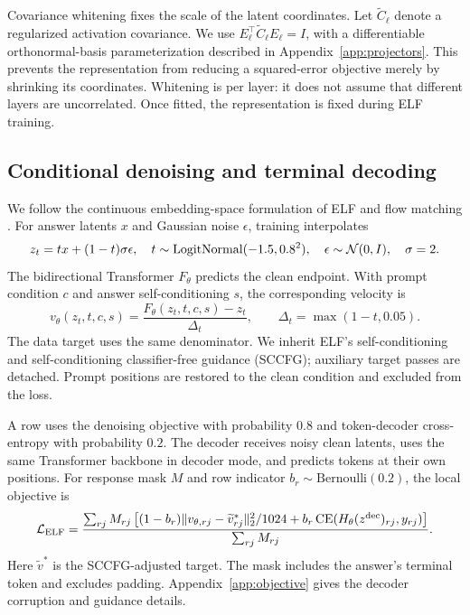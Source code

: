 Covariance whitening fixes the scale of the latent coordinates. Let $\widetilde C_\ell$ denote a regularized activation covariance. We use $E_\ell^\top\widetilde C_\ell E_\ell=I$, with a differentiable orthonormal-basis parameterization described in Appendix~\ref{app:projectors}. This prevents the representation from reducing a squared-error objective merely by shrinking its coordinates. Whitening is per layer: it does not assume that different layers are uncorrelated. Once fitted, the representation is fixed during ELF training.

\subsection{Conditional denoising and terminal decoding}
\label{sec:denoising}
We follow the continuous embedding-space formulation of ELF \citep{elf} and flow matching \citep{flowmatching}. For answer latents $x$ and Gaussian noise $\epsilon$, training interpolates
\begin{equation}
 z_t=t x+(1-t)\sigma\epsilon,\quad
 t\sim\operatorname{LogitNormal}(-1.5,0.8^2),\quad \epsilon\sim\mathcal N(0,I),\quad \sigma=2.
\end{equation}
The bidirectional Transformer $F_\theta$ predicts the clean endpoint. With prompt condition $c$ and answer self-conditioning $s$, the corresponding velocity is
\begin{equation}
 v_\theta(z_t,t,c,s)=\frac{F_\theta(z_t,t,c,s)-z_t}{\Delta_t},
 \qquad \Delta_t=\max(1-t,0.05).
\end{equation}
The data target uses the same denominator. We inherit ELF's self-conditioning and self-conditioning classifier-free guidance (SCCFG); auxiliary target passes are detached. Prompt positions are restored to the clean condition and excluded from the loss.

A row uses the denoising objective with probability $0.8$ and token-decoder cross-entropy with probability $0.2$. The decoder receives noisy clean latents, uses the same Transformer backbone in decoder mode, and predicts tokens at their own positions. For response mask $M$ and row indicator $b_r\sim\mathrm{Bernoulli}(0.2)$, the local objective is
\begin{equation}
 \mathcal L_{\rm ELF}=
 \frac{\sum_{rj}M_{rj}\left[
 (1-b_r)\|v_{\theta,rj}-\widetilde v^*_{rj}\|_2^2/1024
 +b_r\operatorname{CE}(H_\theta(z^{\rm dec})_{rj},y_{rj})\right]}{\sum_{rj}M_{rj}}.
 \label{eq:elf}
\end{equation}
Here $\widetilde v^*$ is the SCCFG-adjusted target. The mask includes the answer's terminal token and excludes padding. Appendix~\ref{app:objective} gives the decoder corruption and guidance details.

